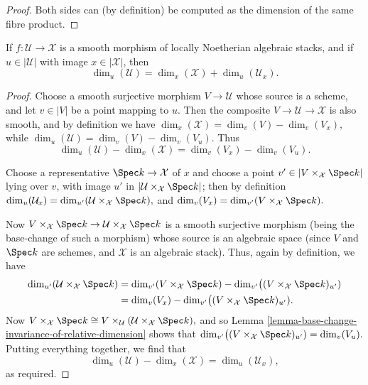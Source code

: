 \begin{proof}
Both sides can (by definition) be computed as the
dimension of the same fibre product.
\end{proof}

\begin{lemma}
\label{lemma-behaviour-of-dimensions-wrt-smooth-morphisms-stacky}
If $f: \mathcal{U} \to \mathcal{X}$ is a smooth morphism of locally Noetherian
algebraic stacks, and
if $u \in |\mathcal{U}|$ with image $x \in |\mathcal{X}|$,
then
$$
\dim_u (\mathcal{U}) = \dim_x(\mathcal{X}) + \dim_{u} (\mathcal{U}_x).
$$
\end{lemma}

\begin{proof}
Choose a smooth surjective morphism $V \to \mathcal{U}$ whose source
is a scheme, and let $v\in |V|$ be a point mapping to $u$.
Then the composite $V \to \mathcal{U} \to \mathcal{X}$ is also smooth,
and by definition we have $\dim_x(\mathcal{X}) = \dim_v(V) - \dim_v(V_x),$
while $\dim_u(\mathcal{U}) = \dim_v(V) - \dim_v(V_u).$
Thus
$$
\dim_u(\mathcal{U}) - \dim_x(\mathcal{X}) = \dim_v (V_x) - \dim_v (V_u).
$$

\medskip\noindent
Choose a representative $\Spec k \to \mathcal{X}$ of $x$
and choose a point $v' \in | V \times_{\mathcal{X}} \Spec k|$ lying over
$v$, with image $u'$ in $|\mathcal{U}\times_{\mathcal{X}} \Spec k|$;
then by definition
$\dim_u(\mathcal{U}_x) = \dim_{u'}(\mathcal{U}\times_{\mathcal{X}} \Spec k),$
and
$\dim_v(V_x) = \dim_{v'}(V\times_{\mathcal{X}} \Spec k).$

\medskip\noindent
Now $V\times_{\mathcal{X}} \Spec k \to \mathcal{U}\times_{\mathcal{X}}\Spec k$
is a smooth surjective morphism (being the base-change
of such a morphism) whose source is an algebraic space
(since $V$ and $\Spec k$ are schemes, and $\mathcal{X}$
is an algebraic stack).  Thus, again by definition,
we have
\begin{align*}
\dim_{u'}(\mathcal{U}\times_{\mathcal{X}} \Spec k)
& =
\dim_{v'}(V\times_{\mathcal{X}} \Spec k) -
\dim_{v'}\bigl( (V\times_{\mathcal{X}} \Spec k)_{u'}) \\
& = \dim_v(V_x) -
\dim_{v'}\bigl( (V\times_{\mathcal{X}} \Spec k)_{u'}).
\end{align*}
Now $V\times_{\mathcal{X}} \Spec k \cong
V\times_{\mathcal{U}} (\mathcal{U}\times_{\mathcal{X}} \Spec k),$
and so
Lemma \ref{lemma-base-change-invariance-of-relative-dimension}
shows that
$\dim_{v'}\bigl( (V\times_{\mathcal{X}} \Spec k)_{u'})  = \dim_v(V_u).$
Putting everything together, we find that
$$
\dim_u(\mathcal{U}) - \dim_x(\mathcal{X}) =
\dim_u(\mathcal{U}_x),
$$
as required.
\end{proof}

